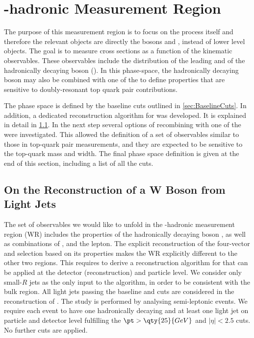 \section{\texorpdfstring{\Wboson}{W}-hadronic Measurement Region}%
\label{sec:regions-wbwb}

The purpose of this measurement region is to focus on the \WbWb process
itself and therefore the relevant objects are directly the \Wboson bosons and \bjets, 
instead of lower level objects.
The goal is to measure cross sections as a function of the \WbWb kinematic
observables. These observables include the \pt distribution of the leading \bjet
and of the hadronically decaying \Wboson boson (\Whad). 
In this phase-space, the hadronically decaying \Wboson boson may also be combined with one 
of the \bjets to define properties that are sensitive to doubly-resonant top quark pair contributions.

The phase space is
defined by the baseline cuts outlined in \cref{sec:BaselineCuts}.
In addition, a dedicated reconstruction algorithm for \Whad was developed.
It is explained in detail in \cref{sec:WhadReco}.
In the next step several options of recombining \Whad with one of the
\bjets were investigated. This allowed the definition of a set of observables
similar to those in top-quark pair measurements, and they are expected to be sensitive to the top-quark mass and width. The final phase space definition
 is given at the end of this section, including a list of all the cuts.

\subsection{On the Reconstruction of a W Boson from Light Jets}%
\label{sec:WhadReco}

The set of observables we would like to unfold in the \Wboson-hadronic measurement region (WR)
includes the properties of the hadronically decaying boson \Whad, as well
as combinations of \Whad, \bjets and the lepton.
The explicit reconstruction of the \Whad four-vector and selection based on its properties makes the WR explicitly different to the other two regions.
This requires to derive a reconstruction algorithm for \Whad that can be applied at the detector
(reconstruction) and particle level.
We consider only small-\(R\) jets as the only input to the algorithm, in order to be consistent with the bulk region. 
All light jets passing the baseline \pt and \eta
cuts are considered in the reconstruction of \Whad. 
The study is performed by analysing semi-leptonic \ttbar events.
We require each event to have one hadronically decaying \Wboson and at least one light jet on particle and detector level fulfilling the \(\pt > \qty{25}{GeV}\) and \(|\eta|<2.5\) cuts. No further cuts are applied.

